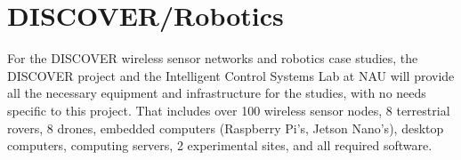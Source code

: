 \documentclass[12pt]{article}
\begin{document}
\section*{DISCOVER/Robotics}

For the DISCOVER wireless sensor networks and robotics case studies, the DISCOVER project and the Intelligent Control Systems Lab at NAU will provide all the necessary equipment and infrastructure for the studies, with no needs specific to this project.
That includes over 100 wireless sensor nodes, 8 terrestrial rovers, 8 drones, embedded computers (Raspberry Pi's, Jetson Nano's), desktop computers, computing servers, 2 experimental sites, and all required software.
\end{document}
